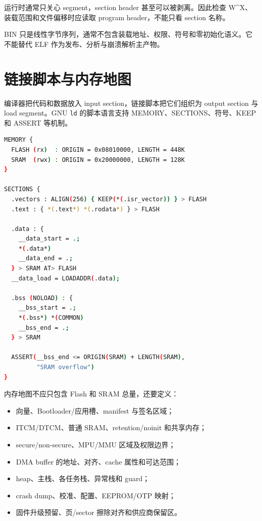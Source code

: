 运行时通常只关心 segment，section header 甚至可以被剥离。因此检查 W\textasciicircum X、装载范围和文件偏移时应读取 program header，不能只看 section 名称。

BIN 只是线性字节序列，通常不包含装载地址、权限、符号和零初始化语义。它不能替代 ELF 作为发布、分析与崩溃解析主产物。

\section{链接脚本与内存地图}

编译器把代码和数据放入 input section，链接脚本把它们组织为 output section 与 load segment。GNU \texttt{ld} 的脚本语言支持 MEMORY、SECTIONS、符号、KEEP 和 ASSERT 等机制\cite{gnuld}。

\begin{minipage}{\linewidth}
\begin{lstlisting}[language=bash,caption={链接脚本的核心契约（示意）}]
MEMORY {
  FLASH (rx)  : ORIGIN = 0x08010000, LENGTH = 448K
  SRAM  (rwx) : ORIGIN = 0x20000000, LENGTH = 128K
}

SECTIONS {
  .vectors : ALIGN(256) { KEEP(*(.isr_vector)) } > FLASH
  .text : { *(.text*) *(.rodata*) } > FLASH

  .data : {
    __data_start = .;
    *(.data*)
    __data_end = .;
  } > SRAM AT> FLASH
  __data_load = LOADADDR(.data);

  .bss (NOLOAD) : {
    __bss_start = .;
    *(.bss*) *(COMMON)
    __bss_end = .;
  } > SRAM

  ASSERT(__bss_end <= ORIGIN(SRAM) + LENGTH(SRAM),
         "SRAM overflow")
}
\end{lstlisting}
\end{minipage}

内存地图不应只包含 Flash 和 SRAM 总量，还要定义：

\begin{itemize}
  \item 向量、Bootloader/应用槽、manifest 与签名区域；
  \item ITCM/DTCM、普通 SRAM、retention/noinit 和共享内存；
  \item secure/non-secure、MPU/MMU 区域及权限边界；
  \item DMA buffer 的地址、对齐、cache 属性和可达范围；
  \item heap、主栈、各任务栈、异常栈和 guard；
  \item crash dump、校准、配置、EEPROM/OTP 映射；
  \item 固件升级预留、页/sector 擦除对齐和供应商保留区。
\end{itemize}

